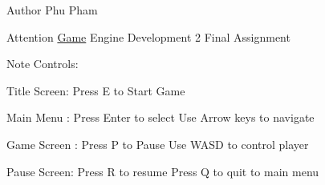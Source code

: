 \begin{DoxyAuthor}{Author}
Phu Pham
\end{DoxyAuthor}
\begin{DoxyAttention}{Attention}
\mbox{\hyperlink{class_game}{Game}} Engine Development 2 Final Assignment
\end{DoxyAttention}
\begin{DoxyNote}{Note}
Controls\+: \begin{DoxyVerb}Title Screen:   Press E to Start Game

Main Menu   :   Press Enter to select
                Use Arrow keys to navigate

Game Screen :   Press P to Pause
                Use WASD to control player

Pause Screen:   Press R to resume
                Press Q to quit to main menu
\end{DoxyVerb}
 
\end{DoxyNote}
